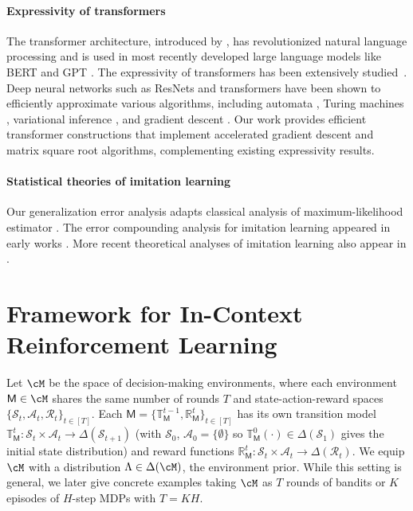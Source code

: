 \documentclass[10pt]{article}
\newcommand{\<}{\left\langle}
\renewcommand{\>}{\right\rangle}
\newcommand{\inst}{{\mathsf{M}}}
\newcommand{\transmodel}{{\mathbb T}}
\newcommand{\rewmodel}{{\mathbb R}}
\newcommand{\totlen}{{T}}
\newcommand{\prior}{{\Lambda}}
\newcommand{\statesp}{{\mathcal{S}}}
\newcommand{\actionsp}{{\mathcal{A}}}
\newcommand{\rewardsp}{{\mathcal{R}}}
\begin{document}
\paragraph{Expressivity of transformers} The transformer architecture, introduced by \cite{vaswani2017attention}, has revolutionized natural language processing and is used in most recently developed large language models like BERT and GPT \citep{devlin2018bert, brown2020language}. The expressivity of transformers has been extensively studied~\citep{yun2019transformers, perez2019turing, hron2020infinite,yao2021self, bhattamishra2020computational, zhang2022unveiling, liu2022transformers, wei2022statistically, fu2023can, bai2023transformers, akyurek2022learning, von2023transformers}. Deep neural networks such as ResNets and transformers have been shown to efficiently approximate various algorithms, including automata \citep{liu2022transformers}, Turing machines \citep{wei2022statistically}, variational inference \citep{mei2023deep}, and gradient descent \citep{bai2023transformers, akyurek2022learning, von2023transformers}. Our work provides efficient transformer constructions that implement accelerated gradient descent and matrix square root algorithms, complementing existing expressivity results.
\paragraph{Statistical theories of imitation learning} Our generalization error analysis adapts classical analysis of maximum-likelihood estimator \citep{geer2000empirical}. The error compounding analysis for imitation learning appeared in early works \citep{ross2011reduction, ross2010efficient}. More recent theoretical analyses of imitation learning also appear in \cite{rajaraman2020toward, rajaraman2021provably, rashidinejad2021bridging}.
\section{Framework for In-Context Reinforcement Learning}\label{sec:framework}
Let $\cM$ be the space of decision-making environments, where each environment $\inst \in \cM$ shares the same number of rounds $\totlen$ and state-action-reward spaces $\{ \statesp_t,  \actionsp_t, \rewardsp_t \}_{t \in [\totlen]}$. Each $\inst = \{\transmodel_\inst^{t-1}, \rewmodel_\inst^t \}_{t \in [\totlen]}$ has its own transition model $\transmodel_\inst^t: \statesp_{t} \times \actionsp_{t} \to \Delta(\statesp_{t+1})$ (with $\statesp_0$, $\actionsp_0 = \{ \emptyset \}$ so $\transmodel_\inst^0(\cdot) \in \Delta(\statesp_1)$ gives the initial state distribution) and reward functions $\rewmodel_\inst^{t}: \statesp_{t} \times \actionsp_{t} \to \Delta(\rewardsp_t)$. We equip $\cM$ with a distribution $\prior \in \Delta(\cM)$, the environment prior. While this setting is general, we later give concrete examples taking $\cM$ as $\totlen$ rounds of bandits or $K$ episodes of $H$-step MDPs with $\totlen = K H$.
\end{document}
